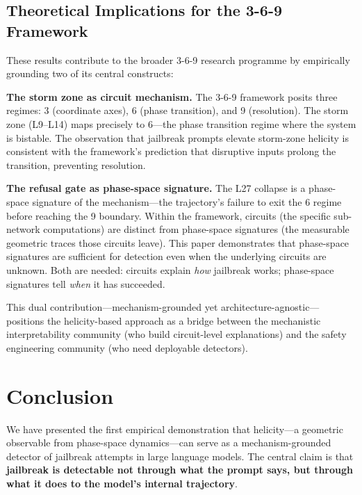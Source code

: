 \documentclass[12pt,a4paper]{article}
\begin{document}
\subsection{Theoretical Implications for the 3-6-9 Framework}

These results contribute to the broader 3-6-9 research programme by empirically grounding two of its central constructs:

\textbf{The storm zone as circuit mechanism.} The 3-6-9 framework posits three regimes: 3 (coordinate axes), 6 (phase transition), and 9 (resolution). The storm zone (L9--L14) maps precisely to 6---the phase transition regime where the system is bistable. The observation that jailbreak prompts elevate storm-zone helicity is consistent with the framework's prediction that disruptive inputs prolong the transition, preventing resolution.

\textbf{The refusal gate as phase-space signature.} The L27 collapse is a phase-space signature of the mechanism---the trajectory's failure to exit the 6 regime before reaching the 9 boundary. Within the framework, circuits (the specific sub-network computations) are distinct from phase-space signatures (the measurable geometric traces those circuits leave). This paper demonstrates that phase-space signatures are sufficient for detection even when the underlying circuits are unknown. Both are needed: circuits explain \textit{how} jailbreak works; phase-space signatures tell \textit{when} it has succeeded.

This dual contribution---mechanism-grounded yet architecture-agnostic---positions the helicity-based approach as a bridge between the mechanistic interpretability community (who build circuit-level explanations) and the safety engineering community (who need deployable detectors).

\section{Conclusion}

We have presented the first empirical demonstration that helicity---a geometric observable from phase-space dynamics---can serve as a mechanism-grounded detector of jailbreak attempts in large language models. The central claim is that \textbf{jailbreak is detectable not through what the prompt says, but through what it does to the model's internal trajectory}.
\end{document}
